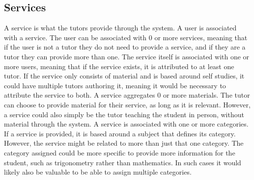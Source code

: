 \subsection{Services}
A service is what the tutors provide through the system. 
A user is associated with a service.
The user can be associated with 0 or more services, meaning that if the user is not a tutor they do not need to provide a service, and if they are a tutor they can provide more than one. 
The service itself is associated with one or more users, meaning that if the service exists, it is attributed to at least one tutor.
If the service only consists of material and is based around self studies, it could have multiple tutors authoring it, meaning it would be necessary to attribute the service to both.
A service aggregates 0 or more materials. 
The tutor can choose to provide material for their service, as long as it is relevant. 
However, a service could also simply be the tutor teaching the student in person, without material through the system.
A service is associated with one or more categories.
If a service is provided, it is based around a subject that defines its category.
However, the service might be related to more than just that one category.
The category assigned could be more specific to provide more information for the student, such as trigonometry rather than mathematics.
In such cases it would likely also be valuable to be able to assign multiple categories.
